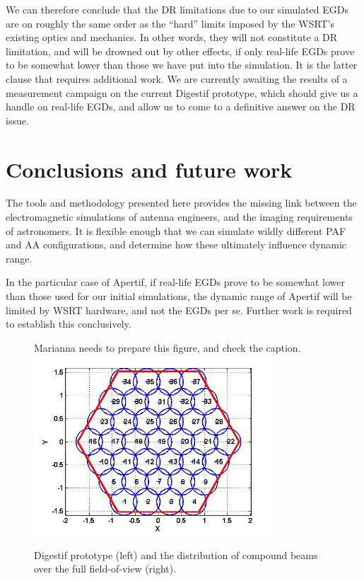 \documentclass[10pt]{article}
\begin{document}
We can therefore conclude that the DR limitations due to our simulated EGDs are on roughly the same order as the ``hard'' limits imposed by the 
WSRT's existing optics and mechanics. In other words, they will not constitute a DR limitation, and will be drowned out by other effects, if only real-life EGDs prove to be somewhat lower than those we have put into the simulation. It is the latter clause that requires additional work. We are currently awaiting the results of a measurement campaign on the current Digestif prototype, which should give us a handle on real-life EGDs, and allow us to come to a  definitive answer on the DR issue.

\section{Conclusions and future work}

The tools and methodology presented here provides the missing link between the electromagnetic simulations of antenna engineers, and the 
imaging requirements of astronomers. It is flexible enough that we can simulate wildly different PAF and AA configurations, and determine how these ultimately influence dynamic range.

In the particular case of Apertif, if real-life EGDs prove to be somewhat lower than those used for our initial simulations, the dynamic range of Apertif will be limited by WSRT hardware, and not the EGDs per se. Further work is required to establish this conclusively.






\begin{figure}
Marianna needs to prepare this figure, and check the caption.
\includegraphics[width=9cm]{ArrangementOfBeams} 
\caption{\label{fig:apertif}Digestif prototype (left) and the distribution of compound beams over the full field-of-view (right).}
\end{figure}
\end{document}
